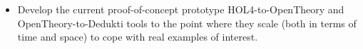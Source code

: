 





\begin{itemize}
  \item Develop the current proof-of-concept prototype
    HOL4-to-OpenTheory and OpenTheory-to-Dedukti tools to the point
    where they scale (both in terms of time and space) to cope with
    real examples of interest.
\end{itemize}
